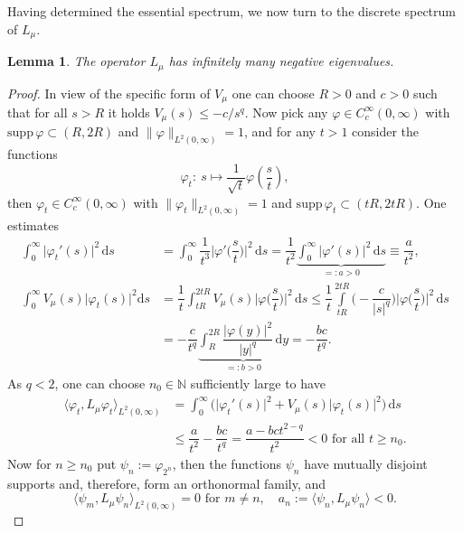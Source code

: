 \documentclass[11pt,oneside,reqno,a4paper]{amsart}
\newcommand{\dd}{\mathrm{d}}
\newcommand{\N}{\mathbb{N}}
\newtheorem{lemma}[theorem]{Lemma}
\theoremstyle{definition}
\begin{document}
Having determined the essential spectrum, we now turn to the discrete spectrum of $L_\mu$. 
\begin{lemma}
The operator $L_\mu$ has infinitely many negative eigenvalues.
\end{lemma}
\begin{proof}
	In view of the specific form of $V_\mu$ one can choose $R>0$ and $c>0$ such that for all $s> R$ it holds $V_\mu(s)\le -c/s^q$. Now pick any $\varphi\in C^\infty_c(0,\infty)$ with $\mathrm{supp}\,\varphi\subset (R,2R)$ and $\|\varphi\|_{L^2(0,\infty)}=1$, and for any $t>1$ consider the functions
	\[
	\varphi_t:\ s\mapsto\dfrac{1}{\sqrt{t}}\varphi\left(\frac{s}{t}\right),
	\]
	then $\varphi_t\in C^\infty_c(0,\infty)$ with $\|\varphi_t\|_{L^2(0,\infty)}=1$ and $\mathrm{supp}\,\varphi_t\subset  (tR,2tR)$. One estimates
\begin{align*}
\int_0^\infty \big| \varphi_t'(s)\big|^2\, \dd s &= \int_0^\infty \dfrac{1}{t^{3}} \Big| \varphi' \Big(\dfrac{s}{t}\Big) \Big|^2 \, \dd s=\dfrac{1}{t^2}\underbrace{\int_0^\infty \big|\varphi'(s)\big|^2\, \dd s}_{=:a>0} \equiv \dfrac{a}{t^2},\\
\int_0^\infty V_\mu(s)\big|\varphi_t(s)\big|^2 \dd s&=\dfrac{1}{t}\int_{t R}^{2 t R} V_\mu(s)\Big|\varphi\Big(\dfrac{s}{t}\Big)\Big|^2\, \dd s\le \dfrac{1}{t} \int\limits_{t R}^{2 t R} \bigg(-\dfrac{c}{|s|^q}\bigg)\Big|\varphi\Big(\dfrac{s}{t}\Big)\Big|^2\, \dd s\\
&=-\dfrac{c}{t^q} \underbrace{\int_R^{2 R} \dfrac{\big|\varphi(y)\big|^2}{|y|^q}\, \dd y}_{=:b>0}=-\dfrac{bc}{t^q}.
\end{align*}
As $q<2$, one can choose $n_0\in\N$ sufficiently large to have
\begin{align*}
 \langle\varphi_t, L_\mu\varphi_t\rangle_{L^2(0,\infty)}&=\int_0^\infty  \Big(\big|\varphi_t'(s)\big|^2+V_\mu(s)\big|\varphi_t(s)\big|^2 \Big)\, \dd s\\
&\le\dfrac{a}{t^2} -\dfrac{bc}{t^q}=\dfrac{a-bc t^{2-q}}{t^2}<0 \text{ for all } t\ge n_0.
\end{align*}
Now for $n\ge n_0$ put $\psi_n:=\varphi_{2^n }$, then the functions $\psi_n$ have mutually
disjoint supports and, therefore, form an orthonormal family, and
\[
\langle \psi_m, L_\mu\psi_n\rangle_{L^2(0,\infty)} =0 \text{ for $m\ne n$}, \quad a_n:=\langle \psi_n, L_\mu\psi_n\rangle <0.
\]


\end{proof}
\end{document}
